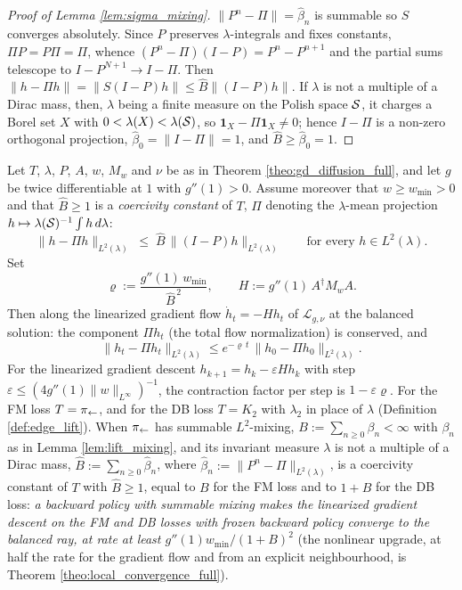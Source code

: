 \begin{proof}[Proof of Lemma \ref{lem:sigma_mixing}]
$\|P^n - \Pi\| = \widehat\beta_n$ is summable so $S$ converges absolutely. Since $P$ preserves $\lambda$-integrals and fixes constants, $\Pi P = P \Pi = \Pi$, whence $(P^n-\Pi)(I-P) = P^n - P^{n+1}$ and the partial sums telescope to $I - P^{N+1} \rightarrow I-\Pi$. Then $\|h-\Pi h\| = \|S(I-P)h\| \leq \widehat B\|(I-P)h\|$. If $\lambda$ is not a multiple of a Dirac mass, then, $\lambda$ being a finite measure on the Polish space $\mathcal S$, it charges a Borel set $X$ with $0<\lambda(X)<\lambda(\mathcal S)$, so $\mathbf 1_X-\Pi\mathbf 1_X\neq0$; hence $I-\Pi$ is a non-zero orthogonal projection, $\widehat\beta_0=\|I-\Pi\|=1$, and $\widehat B\geq\widehat\beta_0=1$.
\end{proof}

\begin{theorem}\label{theo:db_stable_frozen_full}
Let $T$, $\lambda$, $P$, $A$, $w$, $M_w$ and $\nu$ be as in Theorem \ref{theo:gd_diffusion_full}, and let $g$ be twice differentiable at $1$ with $g''(1)>0$. Assume moreover that $w \geq w_{\min} > 0$ and that $\widehat B\geq1$ is a \emph{coercivity constant} of $T$, $\Pi$ denoting the $\lambda$-mean projection $h\mapsto\lambda(\mathcal S)^{-1}\int h\,d\lambda$:
\begin{equation}\label{eq:coercivity}
    \|h-\Pi h\|_{L^2(\lambda)}\;\leq\;\widehat B\,\|(I-P)h\|_{L^2(\lambda)}\qquad\text{for every }h\in L^2(\lambda).
\end{equation}
Set
\begin{equation}
    \varrho := \frac{g''(1)\, w_{\min}}{\widehat B^{\,2}},\qquad H:=g''(1)\,A^\dagger M_wA.
\end{equation}
Then along the linearized gradient flow $\dot h_t=-Hh_t$ of $\mathcal L_{g,\nu}$ at the balanced solution: the component $\Pi h_t$ (the total flow normalization) is conserved, and
\begin{equation}
    \|h_t - \Pi h_t\|_{L^2(\lambda)} \leq e^{-\varrho\, t}\, \|h_0 - \Pi h_0\|_{L^2(\lambda)}.
\end{equation}
For the linearized gradient descent $h_{k+1}=h_k-\varepsilon Hh_k$ with step $\varepsilon \leq \left(4 g''(1)\|w\|_{L^\infty}\right)^{-1}$, the contraction factor per step is $1-\varepsilon\varrho$. For the FM loss $T=\pi_{\leftarrow}$, and for the DB loss $T=K_2$ with $\lambda_2$ in place of $\lambda$ (Definition \ref{def:edge_lift}). When $\pi_{\leftarrow}$ has summable $L^2$-mixing, $B:=\sum_{n\geq0}\beta_n<\infty$ with $\beta_n$ as in Lemma \ref{lem:lift_mixing}, and its invariant measure $\lambda$ is not a multiple of a Dirac mass, $\widehat B:=\sum_{n\geq0}\widehat\beta_n$, where $\widehat\beta_n:=\|P^n-\Pi\|_{L^2(\lambda)}$, is a coercivity constant of $T$ with $\widehat B\geq1$, equal to $B$ for the FM loss and to $1+B$ for the DB loss: \emph{a backward policy with summable mixing makes the linearized gradient descent on the FM and DB losses with frozen backward policy converge to the balanced ray, at rate at least $g''(1)w_{\min}/(1+B)^2$} (the nonlinear upgrade, at half the rate for the gradient flow and from an explicit neighbourhood, is Theorem \ref{theo:local_convergence_full}).

\end{theorem}
